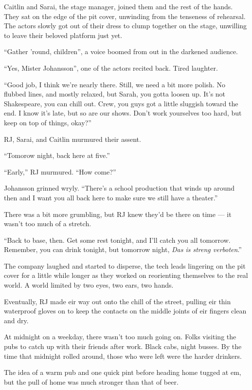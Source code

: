 Caitlin and Sarai, the stage manager, joined them and the rest of the hands. They sat on the edge of the pit cover, unwinding from the tenseness of rehearsal. The actors slowly got out of their dress to clump together on the stage, unwilling to leave their beloved platform just yet.

``Gather 'round, children'', a voice boomed from out in the darkened audience.

``Yes, Mister Johansson'', one of the actors recited back. Tired laughter.

``Good job, I think we're nearly there. Still, we need a bit more polish. No flubbed lines, and mostly relaxed, but Sarah, you gotta loosen up. It's not Shakespeare, you can chill out. Crew, you guys got a little sluggish toward the end. I know it's late, but so are our shows. Don't work yourselves too hard, but keep on top of things, okay?''

RJ, Sarai, and Caitlin murmured their assent.

``Tomorow night, back here at five.''

``Early,'' RJ murmured. ``How come?''

Johansson grinned wryly. ``There's a school production that winds up around then and I want you all back here to make sure we still have a theater.''

There was a bit more grumbling, but RJ knew they'd be there on time --- it wasn't too much of a stretch.

``Back to base, then. Get some rest tonight, and I'll catch you all tomorrow. Remember, you can drink tonight, but tomorrow night, \emph{Das is streng verboten}.''

The company laughed and started to disperse, the tech leads lingering on the pit cover for a little while longer as they worked on reorienting themselves to the real world. A world limited by two eyes, two ears, two hands.

Eventually, RJ made eir way out onto the chill of the street, pulling eir thin waterproof gloves on to keep the contacts on the middle joints of eir fingers clean and dry.

At midnight on a weekday, there wasn't too much going on. Folks visiting the pubs to catch up with their friends after work. Black cabs, night busses. By the time that midnight rolled around, those who were left were the harder drinkers.

The idea of a warm pub and one quick pint before heading home tugged at em, but the pull of home was much stronger than that of beer.

